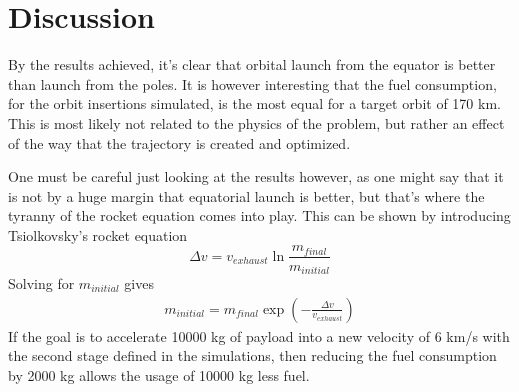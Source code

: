 \documentclass[11pt]{article}
\begin{document}
\section{Discussion}

By the results achieved, it's clear that orbital launch from the equator is better than launch from the poles. 
It is however interesting that the fuel consumption, for the orbit insertions simulated, is the most equal for a target orbit of 170 km. 
This is most likely not related to the physics of the problem, but rather an effect of the way that the trajectory is created and optimized.

One must be careful just looking at the results however, as one might say that it is not by a huge margin that equatorial launch is better, 
but that's where the tyranny of the rocket equation comes into play.
This can be shown by introducing Tsiolkovsky's rocket equation
$$
\Delta v = v_{exhaust} \ln \frac{m_{final}}{m_{initial}}
$$
Solving for $m_{initial}$ gives
$$
\begin{aligned}
  m_{initial} = m_{final} \exp \left( -\frac{\Delta v}{v_{exhaust}} \right)
\end{aligned}
$$
If the goal is to accelerate 10000 kg of payload into a new velocity of 6 km/s with the second stage defined in the simulations, 
then reducing the fuel consumption by 2000 kg allows the usage of 10000 kg less fuel.
\end{document}
